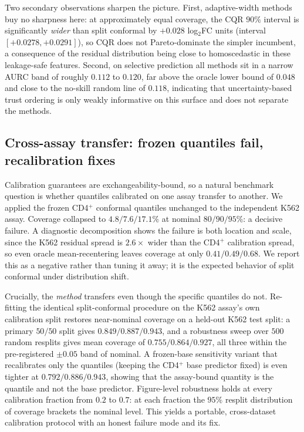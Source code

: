 \documentclass{article}
\begin{document}
Two secondary observations sharpen the picture. First, adaptive-width
methods buy no sharpness here: at approximately equal coverage, the CQR
$90\%$ interval is significantly \emph{wider} than split conformal by
$+0.028$ log$_2$FC units (interval $[+0.0278, +0.0291]$), so CQR does not
Pareto-dominate the simpler incumbent, a consequence of the residual
distribution being close to homoscedastic in these leakage-safe features.
Second, on selective prediction all methods sit in a narrow AURC band of
roughly $0.112$ to $0.120$, far above the oracle lower bound of $0.048$
and close to the no-skill random line of $0.118$, indicating that
uncertainty-based trust ordering is only weakly informative on this
surface and does not separate the methods.

\subsection{Cross-assay transfer: frozen quantiles fail, recalibration fixes}

Calibration guarantees are exchangeability-bound, so a natural benchmark
question is whether quantiles calibrated on one assay transfer to
another. We applied the frozen CD4$^{+}$ conformal quantiles unchanged to
the independent K562 assay. Coverage collapsed to $4.8/7.6/17.1\%$ at
nominal $80/90/95\%$: a decisive failure. A diagnostic decomposition
shows the failure is both location and scale, since the K562 residual
spread is $2.6\times$ wider than the CD4$^{+}$ calibration spread, so even
oracle mean-recentering leaves coverage at only $0.41/0.49/0.68$. We
report this as a negative rather than tuning it away; it is the expected
behavior of split conformal under distribution shift.

Crucially, the \emph{method} transfers even though the specific quantiles
do not. Re-fitting the identical split-conformal procedure on the K562
assay's own calibration split restores near-nominal coverage on a
held-out K562 test split: a primary $50/50$ split gives $0.849/0.887/0.943$,
and a robustness sweep over $500$ random resplits gives mean coverage of
$0.755/0.864/0.927$, all three within the pre-registered $\pm0.05$ band of
nominal. A frozen-base sensitivity variant that recalibrates only the
quantiles (keeping the CD4$^{+}$ base predictor fixed) is even tighter at
$0.792/0.886/0.943$, showing that the assay-bound quantity is the quantile
and not the base predictor. Figure-level robustness holds at every
calibration fraction from $0.2$ to $0.7$: at each fraction the $95\%$
resplit distribution of coverage brackets the nominal level. This yields
a portable, cross-dataset calibration protocol with an honest failure
mode and its fix.
\end{document}
